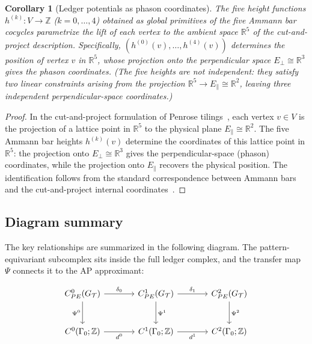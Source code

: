 \documentclass[12pt]{article}
\newtheorem{corollary}[theorem]{Corollary}
\theoremstyle{definition}
\theoremstyle{remark}
\newcommand{\RR}{\mathbb{R}}
\newcommand{\ZZ}{\mathbb{Z}}
\begin{document}
\begin{corollary}[Ledger potentials as phason coordinates]
\label{cor:phason}
The five height functions $h^{(k)}: V \to \ZZ$ ($k = 0, \ldots, 4$) obtained as global primitives of the five Ammann bar cocycles parametrize the lift of each vertex to the ambient space $\RR^5$ of the cut-and-project description. Specifically, $(h^{(0)}(v), \ldots, h^{(4)}(v))$ determines the position of vertex $v$ in $\RR^5$, whose projection onto the perpendicular space $E_\perp \cong \RR^3$ gives the phason coordinates. (The five heights are not independent: they satisfy two linear constraints arising from the projection $\RR^5 \to E_\parallel \cong \RR^2$, leaving three independent perpendicular-space coordinates.)
\end{corollary}

\begin{proof}
In the cut-and-project formulation of Penrose tilings~\cite{BaakeGrimm2013}, each vertex $v \in V$ is the projection of a lattice point in $\RR^5$ to the physical plane $E_\parallel \cong \RR^2$. The five Ammann bar heights $h^{(k)}(v)$ determine the coordinates of this lattice point in $\RR^5$: the projection onto $E_\perp \cong \RR^3$ gives the perpendicular-space (phason) coordinates, while the projection onto $E_\parallel$ recovers the physical position. The identification follows from the standard correspondence between Ammann bars and the cut-and-project internal coordinates~\cite{Forrest2002,Sadun2008}.
\end{proof}

\subsection{Diagram summary}

The key relationships are summarized in the following diagram. The pattern-equivariant subcomplex sits inside the full ledger complex, and the transfer map $\Psi$ connects it to the AP approximant:

\begin{equation}
\begin{tikzcd}[column sep=large, row sep=large]
C^0_{PE}(G_{\mathcal{T}}) \arrow[r, "\delta_0"] \arrow[d, "\Psi^0"'] & C^1_{PE}(G_{\mathcal{T}}) \arrow[r, "\delta_1"] \arrow[d, "\Psi^1"] & C^2_{PE}(G_{\mathcal{T}}) \arrow[d, "\Psi^2"] \\
C^0(\Gamma_0; \ZZ) \arrow[r, "d^0"'] & C^1(\Gamma_0; \ZZ) \arrow[r, "d^1"'] & C^2(\Gamma_0; \ZZ)
\end{tikzcd}
\label{eq:diagram}
\end{equation}
\end{document}
